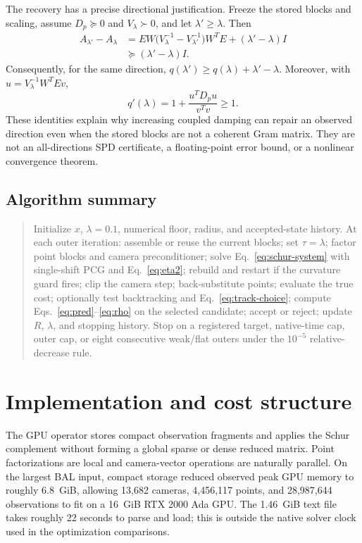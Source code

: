 \documentclass[10pt]{article}
\begin{document}
The recovery has a precise directional justification.  Freeze the stored blocks and scaling, assume $D_p\succeq0$ and $V_\lambda\succ0$, and let $\lambda'\ge\lambda$.  Then
\begin{align}
 A_{\lambda'}-A_\lambda
 &=EW\bigl(V_\lambda^{-1}-V_{\lambda'}^{-1}\bigr)W^TE
   +(\lambda'-\lambda)I\\
 &\succeq(\lambda'-\lambda)I. \label{eq:monotonicity}
\end{align}
Consequently, for the same direction, $q(\lambda')\ge q(\lambda)+\lambda'-\lambda$.  Moreover, with $u=V_\lambda^{-1}W^TEv$,
\begin{equation}
  q'(\lambda)=1+\frac{u^TD_pu}{v^Tv}\ge1. \label{eq:qprime}
\end{equation}
These identities explain why increasing coupled damping can repair an observed direction even when the stored blocks are not a coherent Gram matrix.  They are not an all-directions SPD certificate, a floating-point error bound, or a nonlinear convergence theorem.

\subsection{Algorithm summary}

\begin{quote}\small
Initialize $x$, $\lambda=0.1$, numerical floor, radius, and accepted-state history.  At each outer iteration: assemble or reuse the current blocks; set $\tau=\lambda$; factor point blocks and camera preconditioner; solve Eq.~\eqref{eq:schur-system} with single-shift PCG and Eq.~\eqref{eq:eta2}; rebuild and restart if the curvature guard fires; clip the camera step; back-substitute points; evaluate the true cost; optionally test backtracking and Eq.~\eqref{eq:track-choice}; compute Eqs.~\eqref{eq:pred}--\eqref{eq:rho} on the selected candidate; accept or reject; update $R$, $\lambda$, and stopping history.  Stop on a registered target, native-time cap, outer cap, or eight consecutive weak/flat outers under the $10^{-5}$ relative-decrease rule.
\end{quote}

\section{Implementation and cost structure}

The GPU operator stores compact observation fragments and applies the Schur complement without forming a global sparse or dense reduced matrix.  Point factorizations are local and camera-vector operations are naturally parallel.  On the largest BAL input, compact storage reduced observed peak GPU memory to roughly 6.8~GiB, allowing 13,682 cameras, 4,456,117 points, and 28,987,644 observations to fit on a 16~GiB RTX 2000 Ada GPU.  The 1.46~GiB text file takes roughly 22 seconds to parse and load; this is outside the native solver clock used in the optimization comparisons.
\end{document}
